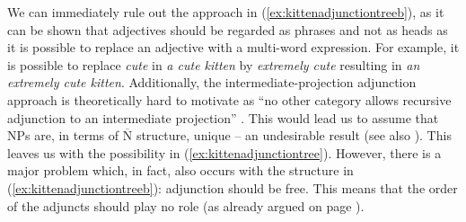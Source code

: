 \begin{exe}
\ex
\begin{multicols}{2}
\begin{xlist}
\ex \label{ex:kittenadjunctiontree}

\ex \label{ex:kittenadjunctiontreeb}


\end{xlist}
\end{multicols}
\end{exe}





\noindent We can immediately rule out the approach in (\ref{ex:kittenadjunctiontreeb}), as it can be shown that adjectives should be regarded as phrases and not as heads as it is possible to replace an adjective with a multi-word expression. For example, it is possible to replace \textit{cute} in \textit{a cute kitten} by \textit{extremely cute} resulting in \textit{an extremely cute kitten}. Additionally, the intermediate-projection adjunction approach is theoretically hard to motivate as ``no other category allows recursive adjunction to an intermediate projection'' \citep[94]{scott2002stacked}. This would lead us to assume that NPs are, in terms of $\overline{\textrm{N}}$ structure, unique -- an undesirable result (see also \citealt{abney1987english}). This leaves us with the possibility in (\ref{ex:kittenadjunctiontree}). However, there is a major problem which, in fact, also occurs with the structure in (\ref{ex:kittenadjunctiontreeb}): adjunction should be free. This means that the order of the adjuncts should play no role (as already argued on page \pageref{generaladjunction}).

